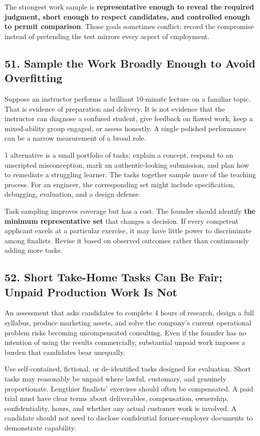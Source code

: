 The strongest work sample is \textbf{representative enough to reveal the required judgment, short enough to respect candidates, and controlled enough to permit comparison}. Those goals sometimes conflict; record the compromise instead of pretending the test mirrors every aspect of employment.

\subsection*{51. Sample the Work Broadly Enough to Avoid Overfitting}

Suppose an instructor performs a brilliant 10-minute lecture on a familiar topic. That is evidence of preparation and delivery. It is not evidence that the instructor can diagnose a confused student, give feedback on flawed work, keep a mixed-ability group engaged, or assess honestly. A single polished performance can be a narrow measurement of a broad role.

1 alternative is a small portfolio of tasks: explain a concept, respond to an unscripted misconception, mark an authentic-looking submission, and plan how to remediate a struggling learner. The tasks together sample more of the teaching process. For an engineer, the corresponding set might include specification, debugging, evaluation, and a design defense.

Task sampling improves coverage but has a cost. The founder should identify \textbf{the minimum representative set} that changes a decision. If every competent applicant excels at a particular exercise, it may have little power to discriminate among finalists. Revise it based on observed outcomes rather than continuously adding more tasks.

\subsection*{52. Short Take-Home Tasks Can Be Fair; Unpaid Production Work Is Not}

An assessment that asks candidates to complete 4 hours of research, design a full syllabus, produce marketing assets, and solve the company's current operational problem risks becoming uncompensated consulting. Even if the founder has no intention of using the results commercially, substantial unpaid work imposes a burden that candidates bear unequally.

Use self-contained, fictional, or de-identified tasks designed for evaluation. Short tasks may reasonably be unpaid where lawful, customary, and genuinely proportionate. Lengthier finalists' exercises should often be compensated. A paid trial must have clear terms about deliverables, compensation, ownership, confidentiality, hours, and whether any actual customer work is involved. A candidate should not need to disclose confidential former-employer documents to demonstrate capability.

